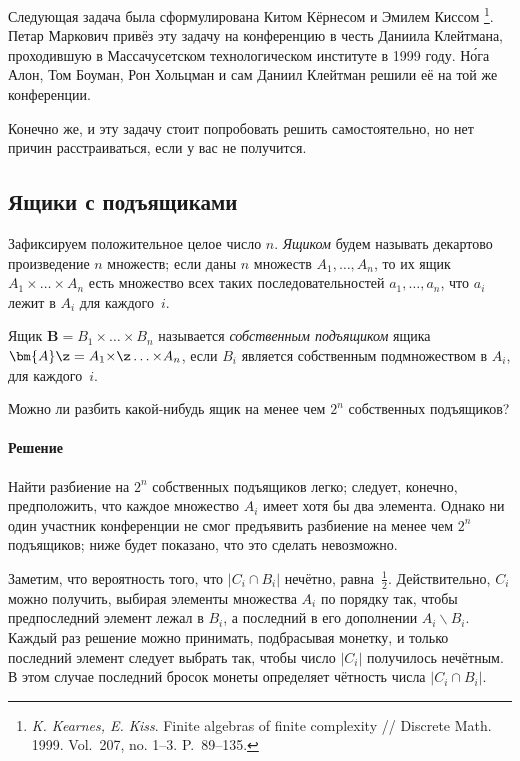 \documentclass[twoside]{book}
\makeatletter
\newcommand{\rindex}[2][\imki@jobname]{%
\index[#1]{\detokenize{#2}}%
}
\makeatother
\begin{document}
\medskip

Следующая задача была сформулирована
Китом Кёрнесом %
и Эмилем Киссом%
\footnote{\emph{K. Kearnes, E. Kiss}. Finite algebras of finite complexity /\!/ {Discrete Math.}  1999. Vol.~207, no. 1--3. P.~89--135.}.
Петар Маркович привёз эту задачу на конференцию в честь Даниила Клейтмана, проходившую в Массачусетском технологическом институте в 1999 году.
Н\'{о}га Алон, Том Боуман, Рон Хольцман и сам Даниил Клейтман решили её на той же конференции.

Конечно же, и эту задачу стоит попробовать решить самостоятельно, но нет причин расстраиваться, если у вас не получится.

\subsection*{Ящики с подъящиками}
\rindex{Ящики с подъящиками}

Зафиксируем положительное целое число $n$.
\emph{Ящиком} будем называть декартово произведение $n$ множеств;
если даны $n$ множеств $A_1,\dots,A_n$, то их ящик $A_1{\times}\dots{\times}A_n$ есть множество всех таких последовательностей $a_1,\dots,a_n$, что $a_i$ лежит в $A_i$ для каждого~$i$.

Ящик $\bm{B}=B_1{\times}\dots{\times}B_n$ называется \emph{собственным подъящиком} ящика $\bm{A}\z=A_1{\times}\z\dots{\times}A_n$, если $B_i$ является собственным подмножеством в $A_i$, для каждого~$i$.

Можно ли разбить какой-нибудь ящик на менее чем $2^n$ собственных подъящиков?

\paragraph{Решение}
Найти разбиение на $2^n$ собственных подъящиков легко; следует, конечно, предположить, что каждое множество $A_i$ имеет хотя бы два элемента.
Однако ни один участник конференции не смог предъявить разбиение на менее чем $2^n$ подъящиков; ниже будет показано, что это сделать невозможно.


Заметим, что вероятность того, что $|C_i\cap B_i|$ нечётно, равна~$\tfrac12$.
Действительно, $C_i$ можно получить, выбирая элементы множества $A_i$ по порядку так, чтобы предпоследний элемент лежал в $B_i$, а последний в его дополнении $A_i\backslash B_i$.
Каждый раз решение можно принимать, подбрасывая монетку, и только последний элемент следует выбрать так, чтобы число $|C_i|$ получилось нечётным.
В этом случае последний бросок монеты определяет чётность числа $|C_i\cap B_i|$.
\end{document}
